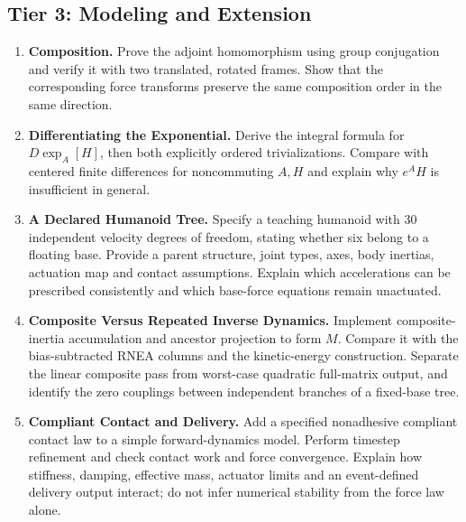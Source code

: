 \subsection{Tier 3: Modeling and Extension}
\begin{enumerate}[itemsep=3pt,topsep=4pt]
\item \textbf{Composition.} Prove the adjoint homomorphism using group conjugation and verify it with two translated, rotated frames. Show that the corresponding force transforms preserve the same composition order in the same direction.
\item \textbf{Differentiating the Exponential.} Derive the integral formula for $D\exp_A[H]$, then both explicitly ordered trivializations. Compare with centered finite differences for noncommuting $A,H$ and explain why $e^AH$ is insufficient in general.
\item \textbf{A Declared Humanoid Tree.} Specify a teaching humanoid with 30 independent velocity degrees of freedom, stating whether six belong to a floating base. Provide a parent structure, joint types, axes, body inertias, actuation map and contact assumptions. Explain which accelerations can be prescribed consistently and which base-force equations remain unactuated.
\item \textbf{Composite Versus Repeated Inverse Dynamics.} Implement composite-inertia accumulation and ancestor projection to form $M$. Compare it with the bias-subtracted RNEA columns and the kinetic-energy construction. Separate the linear composite pass from worst-case quadratic full-matrix output, and identify the zero couplings between independent branches of a fixed-base tree.
\item \textbf{Compliant Contact and Delivery.} Add a specified nonadhesive compliant contact law to a simple forward-dynamics model. Perform timestep refinement and check contact work and force convergence. Explain how stiffness, damping, effective mass, actuator limits and an event-defined delivery output interact; do not infer numerical stability from the force law alone.
\end{enumerate}
